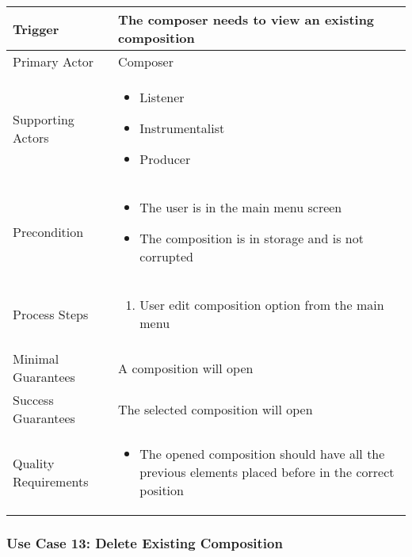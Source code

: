 \begin{tabularx}{\textwidth}{|X|X|}
\hline
Trigger & 
The composer needs to view an existing composition \\
\hline
Primary Actor & 
Composer \\
\hline
Supporting Actors & 
\begin{itemize}
\item Listener
\item Instrumentalist
\item Producer
\end{itemize} \\
\hline
Precondition & 
\begin{itemize}
\item The user is in the main menu screen
\item The composition is in storage and is not corrupted
\end{itemize} \\
\hline
Process Steps & 
\begin{enumerate}
\item User edit composition option from the main menu
\end{enumerate} \\
\hline
Minimal Guarantees & 
A composition will open \\
\hline
Success Guarantees & 
The selected composition will open \\
\hline
Quality Requirements &
\begin{itemize}
\item The opened composition should have all the previous elements placed before in the correct position
\end{itemize} \\ 
\hline
\end{tabularx}

\subsubsection{Use Case 13: Delete Existing Composition}

